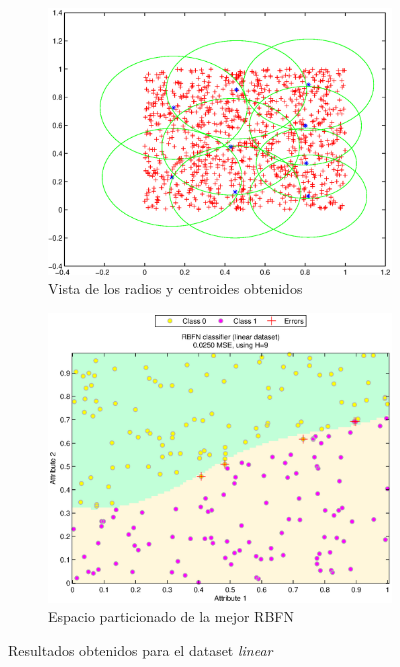 \documentclass[journal]{IEEEtran}
\begin{document}


\begin{figure}
\centering
    \begin{subfigure}[b]{0.5\textwidth}            
            \includegraphics[width=\textwidth]{imagenes/linear-centroids}
            \caption{Vista de los radios y centroides obtenidos}
            \label{fig:linear-centroids}
    \end{subfigure}%
    \begin{subfigure}[b]{0.5\textwidth}
            \centering
            \includegraphics[width=\textwidth]{imagenes/linear}
            \caption{Espacio particionado de la mejor RBFN}
            \label{fig:linear-partition}
    \end{subfigure}
    \caption{Resultados obtenidos para el dataset \emph{linear}}\label{fig:espacio-particionado-linear}
\end{figure}
\end{document}
